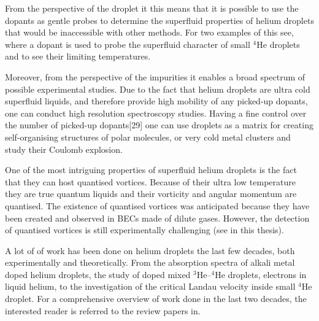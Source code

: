 		From the perspective of the droplet it this means that it is possible to use the dopants as gentle probes to determine the superfluid properties of helium droplets that would be inaccessible with other methods. For two examples of this see, where a dopant is used to probe the superfluid character of small $^4$He droplets and to see their limiting temperatures.
		
		Moreover, from the perspective of the impurities it enables a broad spectrum of possible experimental studies. Due to the fact that helium droplets are ultra cold superfluid liquids, and therefore provide high mobility of any picked-up dopants, one can conduct high resolution spectroscopy studies. Having a fine control over the number of picked-up dopants[29] one can use droplets as a matrix for creating self-organising structures of polar molecules, or very cold metal clusters and study their Coulomb explosion.
				
		One of the most intriguing properties of superfluid helium droplets is the fact that they can host quantised vortices. Because of their ultra low temperature they are true quantum liquids and their vorticity and angular momentum are quantised. The existence of quantised vortices was anticipated because they have been created and observed in BECs made of dilute gases. However, the detection of quantised vortices is still experimentally challenging (see  in this thesis).
		
		A lot of of work has been done on helium droplets the last few decades, both experimentally and theoretically. From the absorption spectra of alkali metal doped helium droplets, the study of doped mixed $^3$He--$^4$He droplets, electrons in liquid helium, to the investigation of the critical Landau velocity inside small $^4$He droplet. For a comprehensive overview of work done in the last two decades, the interested reader is referred to the review papers in.
	
